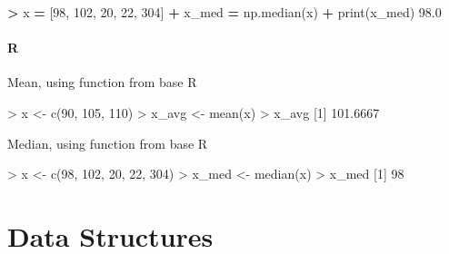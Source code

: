 \documentclass[
]{book}
\newenvironment{Shaded}{\begin{snugshade}}{\end{snugshade}}
\newcommand{\BuiltInTok}[1]{#1}
\newcommand{\DecValTok}[1]{\textcolor[rgb]{0.00,0.00,0.81}{#1}}
\newcommand{\FloatTok}[1]{\textcolor[rgb]{0.00,0.00,0.81}{#1}}
\newcommand{\FunctionTok}[1]{\textcolor[rgb]{0.00,0.00,0.00}{#1}}
\newcommand{\NormalTok}[1]{#1}
\newcommand{\OperatorTok}[1]{\textcolor[rgb]{0.81,0.36,0.00}{\textbf{#1}}}
\newcommand{\OtherTok}[1]{\textcolor[rgb]{0.56,0.35,0.01}{#1}}
\newcommand{\SpecialCharTok}[1]{\textcolor[rgb]{0.00,0.00,0.00}{#1}}
\begin{document}
\begin{Shaded}
\begin{Highlighting}[]
\OperatorTok{\textgreater{}}\NormalTok{ x }\OperatorTok{=}\NormalTok{ [}\DecValTok{98}\NormalTok{, }\DecValTok{102}\NormalTok{, }\DecValTok{20}\NormalTok{, }\DecValTok{22}\NormalTok{, }\DecValTok{304}\NormalTok{]}
\OperatorTok{+}\NormalTok{ x\_med }\OperatorTok{=}\NormalTok{ np.median(x)}
\OperatorTok{+} \BuiltInTok{print}\NormalTok{(x\_med)}
\FloatTok{98.0}
\end{Highlighting}
\end{Shaded}

\hypertarget{r-6}{%
\subsubsection*{R}\label{r-6}}

Mean, using function from base R

\begin{Shaded}
\begin{Highlighting}[]
\SpecialCharTok{\textgreater{}}\NormalTok{ x }\OtherTok{\textless{}{-}} \FunctionTok{c}\NormalTok{(}\DecValTok{90}\NormalTok{, }\DecValTok{105}\NormalTok{, }\DecValTok{110}\NormalTok{)}
\SpecialCharTok{\textgreater{}}\NormalTok{ x\_avg }\OtherTok{\textless{}{-}} \FunctionTok{mean}\NormalTok{(x)}
\SpecialCharTok{\textgreater{}}\NormalTok{ x\_avg}
\NormalTok{[}\DecValTok{1}\NormalTok{] }\FloatTok{101.6667}
\end{Highlighting}
\end{Shaded}

Median, using function from base R

\begin{Shaded}
\begin{Highlighting}[]
\SpecialCharTok{\textgreater{}}\NormalTok{ x }\OtherTok{\textless{}{-}} \FunctionTok{c}\NormalTok{(}\DecValTok{98}\NormalTok{, }\DecValTok{102}\NormalTok{, }\DecValTok{20}\NormalTok{, }\DecValTok{22}\NormalTok{, }\DecValTok{304}\NormalTok{)}
\SpecialCharTok{\textgreater{}}\NormalTok{ x\_med }\OtherTok{\textless{}{-}} \FunctionTok{median}\NormalTok{(x)}
\SpecialCharTok{\textgreater{}}\NormalTok{ x\_med}
\NormalTok{[}\DecValTok{1}\NormalTok{] }\DecValTok{98}
\end{Highlighting}
\end{Shaded}

\hypertarget{data-structures}{%
\chapter{Data Structures}\label{data-structures}}
\end{document}

